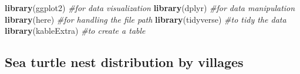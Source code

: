 \documentclass[
]{article}
\newenvironment{Shaded}{\begin{snugshade}}{\end{snugshade}}
\newcommand{\CommentTok}[1]{\textcolor[rgb]{0.56,0.35,0.01}{\textit{#1}}}
\newcommand{\FunctionTok}[1]{\textcolor[rgb]{0.13,0.29,0.53}{\textbf{#1}}}
\newcommand{\NormalTok}[1]{#1}
\begin{document}
\begin{Shaded}
\begin{Highlighting}[]
\FunctionTok{library}\NormalTok{(ggplot2)         }\CommentTok{\#for data visualization}
\FunctionTok{library}\NormalTok{(dplyr)           }\CommentTok{\#for data manipulation}
\FunctionTok{library}\NormalTok{(here)            }\CommentTok{\#for handling the file path}
\FunctionTok{library}\NormalTok{(tidyverse)       }\CommentTok{\#to tidy the data}
\FunctionTok{library}\NormalTok{(kableExtra)      }\CommentTok{\#to create a table}
\end{Highlighting}
\end{Shaded}

\hypertarget{sea-turtle-nest-distribution-by-villages}{%
\subsection{Sea turtle nest distribution by
villages}\label{sea-turtle-nest-distribution-by-villages}}
\end{document}
